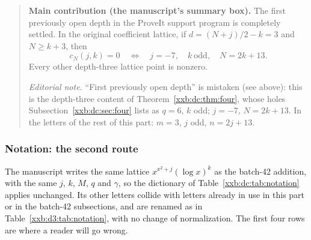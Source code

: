 \documentclass[11pt,a4paper]{article}
\numberwithin{equation}{section}
\theoremstyle{definition}
\theoremstyle{remark}
\theoremstyle{plain}
\begin{document}
\begin{quote}\small
\textbf{Main contribution (the manuscript's summary box).}
The first previously open depth in the ProveIt support program is completely
settled.  In the original coefficient lattice, if
$d=(N+j)/2-k=3$ and $N\geq k+3$, then
\[
 c_N(j,k)=0
 \quad\Longleftrightarrow\quad
 j=-7,\quad k\ \text{odd},\quad N=2k+13.
\]
Every other depth-three lattice point is nonzero.

\smallskip
\emph{Editorial note.}  ``First previously open depth'' is mistaken (see
above): this is the depth-three content of Theorem~\ref{xxb:dc:thm:four},
whose holes Subsection~\ref{xxb:dc:sec:four} lists as $q=6$, $k$ odd;
$j=-7$, $N=2k+13$.  In the letters of the rest of this part: $m=3$, $j$ odd,
$n=2j+13$.
\end{quote}

\subsubsection{Notation: the second route}\label{xxb:d3:sec:notation}

The manuscript writes the same lattice $x^{x^2+j}(\log x)^k$ as the batch-42
addition, with the same $j$, $k$, $M$, $q$ and $\gamma$, so the dictionary of
Table~\ref{xxb:dc:tab:notation} applies unchanged.  Its other letters collide
with letters already in use in this part or in the batch-42 subsections, and
are renamed as in Table~\ref{xxb:d3:tab:notation}, with no change of
normalization.  The first four rows are where a reader will go wrong.
\end{document}

